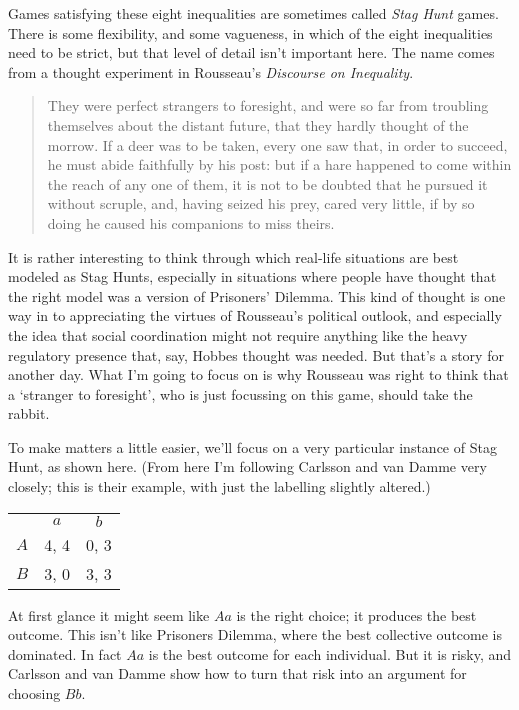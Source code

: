 \documentclass[11pt,]{book}
\def\toprule{}
\def\bottomrule{}
\begin{document}
Games satisfying these eight inequalities are sometimes called \emph{Stag Hunt} games. There is some flexibility, and some vagueness, in which of the eight inequalities need to be strict, but that level of detail isn't important here. The name comes from a thought experiment in Rousseau's \emph{Discourse on Inequality}.

\begin{quote}
They were perfect strangers to foresight, and were so far from troubling themselves about the distant future, that they hardly thought of the morrow. If a deer was to be taken, every one saw that, in order to succeed, he must abide faithfully by his post: but if a hare happened to come within the reach of any one of them, it is not to be doubted that he pursued it without scruple, and, having seized his prey, cared very little, if by so doing he caused his companions to miss theirs. ~\citep[ 209--10]{Rousseau1913}
\end{quote}

It is rather interesting to think through which real-life situations are best modeled as Stag Hunts, especially in situations where people have thought that the right model was a version of Prisoners' Dilemma. This kind of thought is one way in to appreciating the virtues of Rousseau's political outlook, and especially the idea that social coordination might not require anything like the heavy regulatory presence that, say, Hobbes thought was needed. But that's a story for another day. What I'm going to focus on is why Rousseau was right to think that a `stranger to foresight', who is just focussing on this game, should take the rabbit.

To make matters a little easier, we'll focus on a very particular instance of Stag Hunt, as shown here. (From here I'm following Carlsson and van Damme very closely; this is their example, with just the labelling slightly altered.)

\begin{longtable}[]{@{}lcc@{}}
\toprule
\endhead
& \(a\) & \(b\)\tabularnewline
\(A\) & 4, 4 & 0, 3\tabularnewline
\(B\) & 3, 0 & 3, 3\tabularnewline
\bottomrule
\end{longtable}

At first glance it might seem like \(Aa\) is the right choice; it produces the best outcome. This isn't like Prisoners Dilemma, where the best collective outcome is dominated. In fact \(Aa\) is the best outcome for each individual. But it is risky, and Carlsson and van Damme show how to turn that risk into an argument for choosing \(Bb\).
\end{document}
